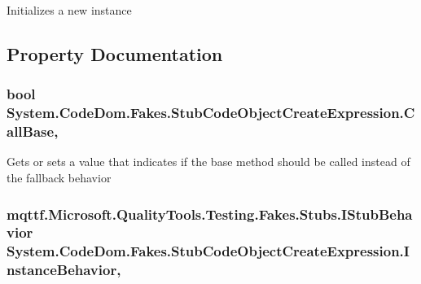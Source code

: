 Initializes a new instance



\subsection{Property Documentation}
\hypertarget{class_system_1_1_code_dom_1_1_fakes_1_1_stub_code_object_create_expression_a2671c7ec2eac545e34cb842a1f87a16d}{
\subsubsection[{Call\-Base}]{\setlength{\rightskip}{0pt plus 5cm}bool System.\-Code\-Dom.\-Fakes.\-Stub\-Code\-Object\-Create\-Expression.\-Call\-Base\hspace{0.3cm}{\ttfamily [get]}, {\ttfamily [set]}}}\label{class_system_1_1_code_dom_1_1_fakes_1_1_stub_code_object_create_expression_a2671c7ec2eac545e34cb842a1f87a16d}


Gets or sets a value that indicates if the base method should be called instead of the fallback behavior

\hypertarget{class_system_1_1_code_dom_1_1_fakes_1_1_stub_code_object_create_expression_a1b8d2a75df9a6f0a97149bcaba7037f6}{
\subsubsection[{Instance\-Behavior}]{\setlength{\rightskip}{0pt plus 5cm}mqttf.\-Microsoft.\-Quality\-Tools.\-Testing.\-Fakes.\-Stubs.\-I\-Stub\-Behavior System.\-Code\-Dom.\-Fakes.\-Stub\-Code\-Object\-Create\-Expression.\-Instance\-Behavior\hspace{0.3cm}{\ttfamily [get]}, {\ttfamily [set]}}}\label{class_system_1_1_code_dom_1_1_fakes_1_1_stub_code_object_create_expression_a1b8d2a75df9a6f0a97149bcaba7037f6}


